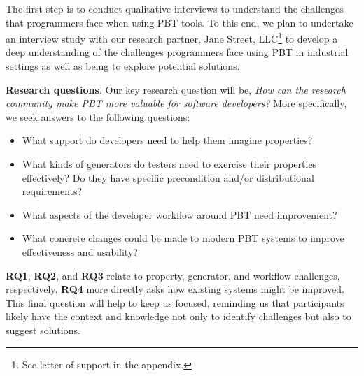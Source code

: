 \label{sec:orientation}


\label{sec:motivation}

The first step is to conduct qualitative interviews to understand the challenges
that programmers face when using PBT tools. To this end, we plan to undertake an
interview study with our research partner, Jane Street, LLC\footnote{See letter
of support in the appendix.} to develop a deep understanding of the challenges
programmers face using PBT in industrial settings as well as being to explore
potential solutions.

\textbf{Research questions}.
Our key research question will be, \emph{How can the research community make PBT
more valuable for software developers?} More specifically, we seek
answers to the following questions:

\begin{itemize}[noitemsep,leftmargin=4em]
\item[\bf RQ1.] What support do developers need to help them imagine properties? 
\item[\bf RQ2.] What kinds of generators do testers need to exercise their
  properties effectively? Do they have specific precondition and/or distributional
  requirements?
\item[\bf RQ3.] What aspects of the developer workflow around PBT need improvement?
\item[\bf RQ4.] What concrete changes could be made to modern PBT systems
  to improve effectiveness and usability?
\end{itemize}

{\bf RQ1}, {\bf RQ2}, and {\bf RQ3} relate to property,
generator, and workflow challenges, respectively.
{\bf RQ4} more directly asks how existing systems might
be improved. This final question will help to keep us focused,
reminding us that participants likely have the context and knowledge not
only to identify challenges but also to suggest
solutions.

